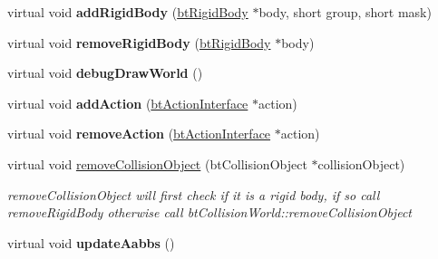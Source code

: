 \begin{DoxyCompactItemize}
\item 
\hypertarget{classbt_simple_dynamics_world_a9ea7739dd5c2b5f5f114440b0741ed43}{virtual void {\bfseries add\+Rigid\+Body} (\hyperlink{classbt_rigid_body}{bt\+Rigid\+Body} $\ast$body, short group, short mask)}\label{classbt_simple_dynamics_world_a9ea7739dd5c2b5f5f114440b0741ed43}

\item 
\hypertarget{classbt_simple_dynamics_world_ab6034d6e27ccee6a279e695d87586795}{virtual void {\bfseries remove\+Rigid\+Body} (\hyperlink{classbt_rigid_body}{bt\+Rigid\+Body} $\ast$body)}\label{classbt_simple_dynamics_world_ab6034d6e27ccee6a279e695d87586795}

\item 
\hypertarget{classbt_simple_dynamics_world_aa9a10982644f81b5a8a27420611ba41a}{virtual void {\bfseries debug\+Draw\+World} ()}\label{classbt_simple_dynamics_world_aa9a10982644f81b5a8a27420611ba41a}

\item 
\hypertarget{classbt_simple_dynamics_world_ae5edd46b00db8cbb67bd3b4b6b230e2b}{virtual void {\bfseries add\+Action} (\hyperlink{classbt_action_interface}{bt\+Action\+Interface} $\ast$action)}\label{classbt_simple_dynamics_world_ae5edd46b00db8cbb67bd3b4b6b230e2b}

\item 
\hypertarget{classbt_simple_dynamics_world_a9ef9438d5a167b5a84f6f0562cd8dbe9}{virtual void {\bfseries remove\+Action} (\hyperlink{classbt_action_interface}{bt\+Action\+Interface} $\ast$action)}\label{classbt_simple_dynamics_world_a9ef9438d5a167b5a84f6f0562cd8dbe9}

\item 
\hypertarget{classbt_simple_dynamics_world_a7c9255653135c9117d6a27738a3077ab}{virtual void \hyperlink{classbt_simple_dynamics_world_a7c9255653135c9117d6a27738a3077ab}{remove\+Collision\+Object} (bt\+Collision\+Object $\ast$collision\+Object)}\label{classbt_simple_dynamics_world_a7c9255653135c9117d6a27738a3077ab}

\begin{DoxyCompactList}\small\item\em remove\+Collision\+Object will first check if it is a rigid body, if so call remove\+Rigid\+Body otherwise call bt\+Collision\+World\+::remove\+Collision\+Object \end{DoxyCompactList}\item 
\hypertarget{classbt_simple_dynamics_world_a861597935f53ccc9cc1c4a7cd0c95240}{virtual void {\bfseries update\+Aabbs} ()}\label{classbt_simple_dynamics_world_a861597935f53ccc9cc1c4a7cd0c95240}


\end{DoxyCompactItemize}
